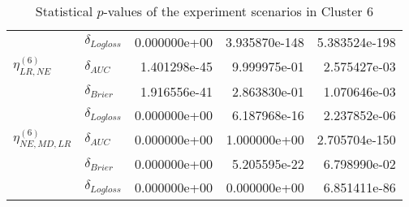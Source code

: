 \begin{table}[!h]
\begin{tabular}{l|lrrr}
                              & $\delta_{Logloss}$ &           0.000000e+00 &    3.935870e-148 &            5.383524e-198 \\
    $\eta^{(6)}_{LR, NE}$ & $\delta_{AUC}$ &           1.401298e-45 &     9.999975e-01 &             2.575427e-03 \\
                              & $\delta_{Brier}$ &           1.916556e-41 &     2.863830e-01 &             1.070646e-03 \\
                              & $\delta_{Logloss}$ &           0.000000e+00 &     6.187968e-16 &             2.237852e-06 \\
    $\eta^{(6)}_{NE, MD, LR}$ & $\delta_{AUC}$ &           0.000000e+00 &     1.000000e+00 &            2.705704e-150 \\
                              & $\delta_{Brier}$ &           0.000000e+00 &     5.205595e-22 &             6.798990e-02 \\
                              & $\delta_{Logloss}$ &           0.000000e+00 &     0.000000e+00 &             6.851411e-86 \\
    \bottomrule
    \end{tabular}
    \caption{Statistical $p$-values of the experiment scenarios in Cluster 6}
    \end{table}
